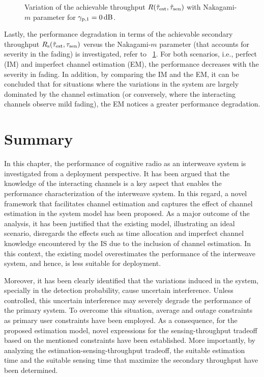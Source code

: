 {\begin{figure}[!ht]
\caption{Variation of the achievable throughput $R(\tilde{\tau}_{\text{est}}, \tilde{\tau}_{\text{sen}})$ with Nakagami-$m$ parameter for ${\gamma}_{\text{p,1}} = \SI{0}{dB}$.}
\label{fig_IS:optT_m}
\end{figure}

Lastly, the performance degradation in terms of the achievable secondary throughput $R_{\text{s}}(\tilde{\tau}_{\text{est}}, \tau_{\text{sen}})$ versus the Nakagami-$m$ parameter (that accounts for severity in the fading) is investigated, refer to \figurename~\ref{fig_IS:optT_m}. For both scenarios, i.e., perfect (IM) and imperfect channel estimation (EM), the performance decreases with the severity in fading. In addition, by comparing the IM and the EM, it can be concluded that for situations where the variations in the system are largely dominated by the channel estimation (or conversely, where the interacting channels observe mild fading), the EM notices a greater performance degradation.


\section{Summary} \label{sec_IS:conc}
In this chapter, the performance of cognitive radio as an interweave system is investigated from a deployment perspective. It has been argued that the knowledge of the interacting channels is a key aspect that enables the performance characterization of the interweave system. In this regard, a novel framework that facilitates channel estimation and captures the effect of channel estimation in the system model has been proposed. As a major outcome of the analysis, it has been justified that the existing model, illustrating an ideal scenario, disregards the effects such as time allocation and imperfect channel knowledge encountered by the IS due to the inclusion of channel estimation. In this context, the existing model overestimates the performance of the interweave system, and hence, is less suitable for deployment. 

Moreover, it has been clearly identified that the variations induced in the system, specially in the detection probability, cause uncertain interference. Unless controlled, this uncertain interference may severely degrade the performance of the primary system. To overcome this situation, average and outage constraints as primary user constraints have been employed. As a consequence, for the proposed estimation model, novel expressions for the sensing-throughput tradeoff based on the mentioned constraints have been established. More importantly, by analyzing the estimation-sensing-throughput tradeoff, the suitable estimation time and the suitable sensing time that maximize the secondary throughput have been determined. %

}
